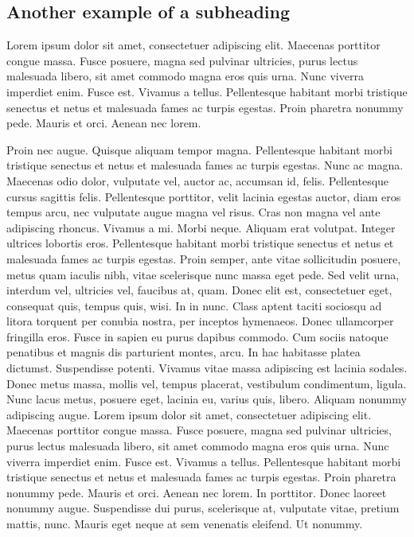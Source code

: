 \documentclass{biorxiv}
\begin{document}
\subsection{Another example of a subheading}
Lorem ipsum dolor sit amet, consectetuer adipiscing elit. Maecenas porttitor
congue massa. Fusce posuere, magna sed pulvinar ultricies, purus lectus
malesuada libero, sit amet commodo magna eros quis urna. Nunc viverra
imperdiet enim. Fusce est. Vivamus a tellus. Pellentesque habitant morbi
tristique senectus et netus et malesuada fames ac turpis egestas. Proin
pharetra nonummy pede. Mauris et orci. Aenean nec lorem.

Proin nec augue. Quisque aliquam tempor magna. Pellentesque habitant morbi
tristique senectus et netus et malesuada fames ac turpis egestas. Nunc ac
magna. Maecenas odio dolor, vulputate vel, auctor ac, accumsan id, felis.
Pellentesque cursus sagittis felis. Pellentesque porttitor, velit lacinia
egestas auctor, diam eros tempus arcu, nec vulputate augue magna vel risus.
Cras non magna vel ante adipiscing rhoncus. Vivamus a mi. Morbi neque. Aliquam
erat volutpat. Integer ultrices lobortis eros. Pellentesque habitant morbi
tristique senectus et netus et malesuada fames ac turpis egestas. Proin
semper, ante vitae sollicitudin posuere, metus quam iaculis nibh, vitae
scelerisque nunc massa eget pede. Sed velit urna, interdum vel, ultricies
vel, faucibus at, quam. Donec elit est, consectetuer eget, consequat quis,
tempus quis, wisi. In in nunc. Class aptent taciti sociosqu ad litora
torquent per conubia nostra, per inceptos hymenaeos. Donec ullamcorper
fringilla eros. Fusce in sapien eu purus dapibus commodo. Cum sociis natoque
penatibus et magnis dis parturient montes, arcu. In hac habitasse platea
dictumst. Suspendisse potenti. Vivamus vitae massa adipiscing est lacinia
sodales. Donec metus massa, mollis vel, tempus placerat, vestibulum
condimentum, ligula. Nunc lacus metus, posuere eget, lacinia eu, varius quis,
libero. Aliquam nonummy adipiscing augue. Lorem ipsum dolor sit amet,
consectetuer adipiscing elit. Maecenas porttitor congue massa. Fusce posuere,
magna sed pulvinar ultricies, purus lectus malesuada libero, sit amet commodo
magna eros quis urna. Nunc viverra imperdiet enim. Fusce est. Vivamus a
tellus. Pellentesque habitant morbi tristique senectus et netus et malesuada
fames ac turpis egestas. Proin pharetra nonummy pede. Mauris et orci. Aenean
nec lorem. In porttitor. Donec laoreet nonummy augue. Suspendisse dui purus,
scelerisque at, vulputate vitae, pretium mattis, nunc. Mauris eget neque at
sem venenatis eleifend. Ut nonummy.
\end{document}
